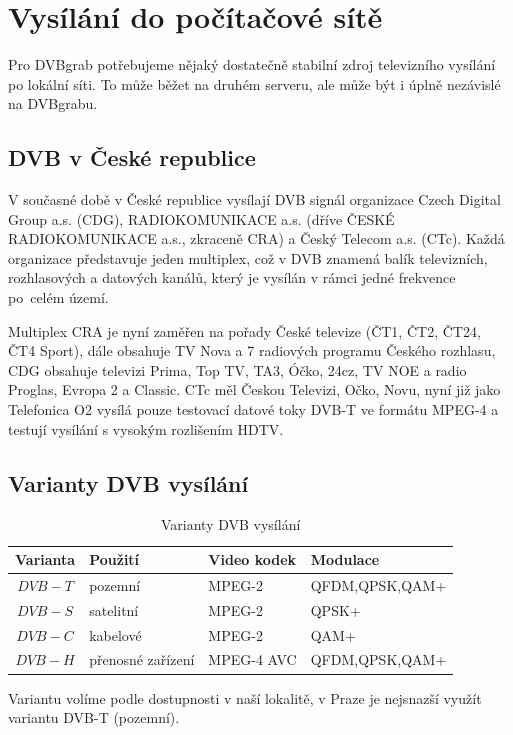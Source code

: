 \chapter{Vysílání do počítačové sítě}
Pro DVBgrab potřebujeme nějaký dostatečně stabilní zdroj televizního vysílání po lokální síti. To může běžet na druhém serveru, ale může být i úplně nezávislé na DVBgrabu.

\section{DVB v České republice}
V současné době v České republice vysílají DVB signál organizace Czech Digital Group a.s. (CDG), RADIOKOMUNIKACE a.s. (dříve ČESKÉ RADIOKOMUNIKACE a.s., zkraceně CRA) a Český Telecom a.s. (CTc). Každá organizace představuje jeden multiplex, což v DVB znamená balík televizních, rozhlasových a datových kanálů, který je vysílán v rámci jedné frekvence po~celém území.

Multiplex CRA je nyní zaměřen na pořady České televize (ČT1, ČT2, ČT24, ČT4 Sport), dále obsahuje TV Nova a 7 radiových programu Českého rozhlasu, CDG obsahuje televizi Prima, Top TV, TA3, Óčko, 24cz, TV NOE a radio Proglas, Evropa 2 a Classic. CTc měl Českou Televizi, Očko, Novu, nyní již jako Telefonica O2 vysílá pouze testovací datové toky DVB-T ve formátu MPEG-4 a testují vysílání s vysokým rozlišením HDTV.

\section{Varianty DVB vysílání}
\begin{table}[ht]
\begin{center}
\begin{tabular}{|c|l|l|l|}
\hline
\bf{Varianta} & \bf{Použití} & \bf{Video kodek} & \bf{Modulace} \\
\hline
$DVB-T$ & pozemní & MPEG-2 & QFDM,QPSK,QAM+\\
\hline
$DVB-S$ & satelitní & MPEG-2 & QPSK+\\
\hline
$DVB-C$ & kabelové & MPEG-2 & QAM+\\
\hline
$DVB-H$ & přenosné zařízení & MPEG-4 AVC & QFDM,QPSK,QAM+\\
\hline
\end{tabular}
\end{center}
\caption{Varianty DVB vysílání}
\label{tab:tab1}
\end{table}

Variantu volíme podle dostupnosti v naší lokalitě, v Praze je nejsnazší využít variantu DVB-T (pozemní).

